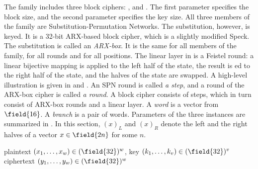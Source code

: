 
The \sparx{} family includes three block ciphers: , and . The first parameter specifies the block size, and the second parameter specifies the key size. All three members of the family are Substitution-Permutation Networks. The substitution, however, is keyed. It is a 32-bit ARX-based block cipher, which is a slightly modified Speck. The substitution is called an \emph{ARX-box}. It is the same for all members of the family, for all rounds and for all positions. The linear layer in \sparx{} is a Feistel round: a linear bijective mapping is applied to the left half of the state, the result is \txor{}ed to the right half of the state, and the halves of the state are swapped. A high-level illustration is given in  and . An SPN round is called \emph{a step}, and a round of the ARX-box cipher is called \emph{a round}. A \sparx{} block cipher consists of steps, which in turn consist of ARX-box rounds and a linear layer. A \emph{word} is a vector from $\field{16}$. A \emph{branch} is a pair of words. Parameters of the three \sparx{} instances are summarized in . In this section, $(x)_L$ and $(x)_R$ denote the left and the right halves of a vector $x \in \field{2n}$ for some $n$.

\begin{algorithm}
\begin{algorithmic}[1]
\Require plaintext $(x_1, \ldots, x_w) \in (\field{32})^w$, key $(k_1, \ldots, k_v) \in (\field{32})^v$
\Ensure ciphertext $(y_1, \ldots, y_w) \in (\field{32})^w$
\Statex{}
        \EndFor
         
    \EndFor
     
\EndFor
{}
\end{algorithmic}
\end{algorithm}


